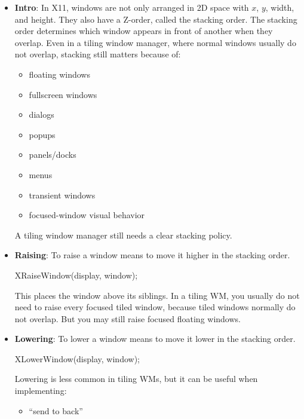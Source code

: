 \documentclass{report}
\begin{document}
    \pagebreak 
    \begin{itemize}
        \item \textbf{Intro}: In X11, windows are not only arranged in 2D space with $x$, $y$, width, and height. They also have a Z-order, called the stacking order.
            \bigbreak \noindent 
            The stacking order determines which window appears in front of another when they overlap.
            \bigbreak \noindent 
            Even in a tiling window manager, where normal windows usually do not overlap, stacking still matters because of:
            \begin{itemize}
                \item floating windows
                \item fullscreen windows
                \item dialogs
                \item popups
                \item panels/docks
                \item menus
                \item transient windows
                \item focused-window visual behavior
            \end{itemize}
            A tiling window manager still needs a clear stacking policy.
        \item \textbf{Raising}: To raise a window means to move it higher in the stacking order.
            \bigbreak \noindent 
            \begin{cppcode}
            XRaiseWindow(display, window);
            \end{cppcode}
            \bigbreak \noindent 
            This places the window above its siblings. In a tiling WM, you usually do not need to raise every focused tiled window, because tiled windows normally do not overlap. But you may still raise focused floating windows.
        \item \textbf{Lowering}: To lower a window means to move it lower in the stacking order.
            \bigbreak \noindent 
            \begin{cppcode}
            XLowerWindow(display, window); 
            \end{cppcode}
            \bigbreak \noindent 
            Lowering is less common in tiling WMs, but it can be useful when implementing:
            \begin{itemize}
                \item “send to back”

\end{itemize}
\end{itemize}
\end{document}
